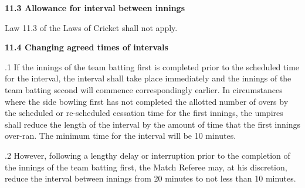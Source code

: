 \documentclass[12pt]{article}
\begin{document}
\vspace{\baselineskip}
{\fontsize{11pt}{13.2pt}\selectfont \textbf{11.3 \tabto{0.47in} Allowance for interval between innings}\par}\par


\vspace{\baselineskip}
\begin{adjustwidth}{0.49in}{0.0in}
{\fontsize{9pt}{10.8pt}\selectfont Law 11.3 of the Laws of Cricket shall not apply.\par}\par

\end{adjustwidth}


\vspace{\baselineskip}
{\fontsize{11pt}{13.2pt}\selectfont \textbf{11.4 \tabto{0.47in} Changing agreed times of intervals}\par}\par


\vspace{\baselineskip}
\begin{adjustwidth}{0.5in}{0.04in}
{\fontsize{9pt}{10.8pt}.1 \tabto{0.49in} If the innings of the team batting first is completed prior to the scheduled time for the interval, the interval shall take place immediately and the innings of the team batting second will commence correspondingly earlier. In circumstances where the side bowling first has not completed the allotted number of overs by the scheduled or re-scheduled cessation time for the first innings, the umpires shall reduce the length of the interval by the amount of time that the first innings over-ran. The minimum time for the interval will be 10 minutes.\par}\par

\end{adjustwidth}


\vspace{\baselineskip}
\begin{adjustwidth}{0.5in}{0.15in}
\begin{justify}
{\fontsize{9pt}{10.8pt}.2 \tabto{0.49in} However, following a lengthy delay or interruption prior to the completion of the innings of the team batting first, the Match Referee may, at his discretion, reduce the interval between innings from 20 minutes to not less than 10 minutes.\par}
\end{justify}\par

\end{adjustwidth}
\end{document}
